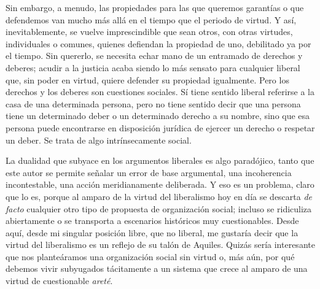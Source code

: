 \documentclass[12pt,a4paper]{article}
\begin{document}
Sin embargo, a menudo, las propiedades para las que queremos garantías o que defendemos van mucho más allá en el tiempo que el periodo de virtud. Y así, inevitablemente, se vuelve imprescindible que sean otros, con otras virtudes, individuales o comunes, quienes defiendan la propiedad de uno, debilitado ya por el tiempo. Sin quererlo, se necesita echar mano de un entramado de derechos y deberes; acudir a la justicia acaba siendo lo más sensato para cualquier liberal que, sin poder en virtud, quiere defender su propiedad igualmente. Pero los derechos y los deberes son cuestiones sociales. Sí tiene sentido liberal referirse a la casa de una determinada persona, pero no tiene sentido decir que una persona tiene un determinado deber o un determinado derecho a su nombre, sino que esa persona puede encontrarse en disposición jurídica de ejercer un derecho o respetar un deber. Se trata de algo intrínsecamente social.

La dualidad que subyace en los argumentos liberales es algo paradójico, tanto que este autor se permite señalar un error de base argumental, una incoherencia incontestable, una acción meridianamente deliberada. Y eso es un problema, claro que lo es, porque al amparo de la virtud del liberalismo hoy en día se descarta \emph{de facto} cualquier otro tipo de propuesta de organización social; incluso se ridiculiza abiertamente o se transporta a escenarios históricos muy cuestionables. Desde aquí, desde mi singular posición libre, que no liberal, me gustaría decir que la virtud del liberalismo es un reflejo de su talón de Aquiles. Quizás sería interesante que nos planteáramos una organización social sin virtud o, más aún, por qué debemos vivir subyugados tácitamente a un sistema que crece al amparo de una virtud de cuestionable \emph{areté}.
\end{document}

